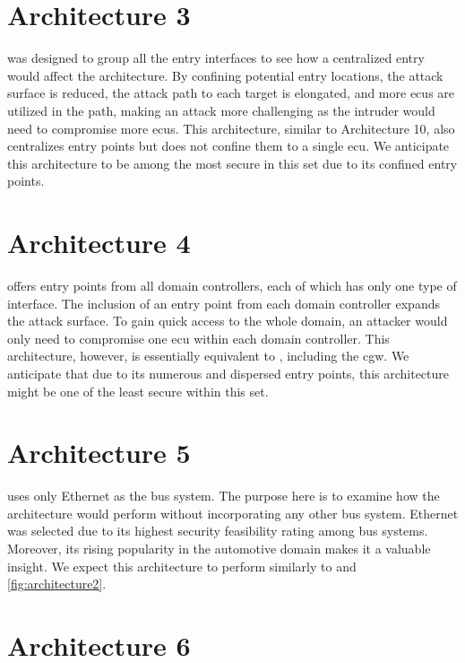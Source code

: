 \section{Architecture 3}
\label{subsec:arch3}

 was designed to group all the entry interfaces to see how a centralized entry would affect the architecture. 
By confining potential entry locations, the attack surface is reduced, the attack path to each target is elongated, 
and more \acrshort{ecu}s are utilized in the path, making an attack more challenging as the intruder would need to compromise more \acrshort{ecu}s. 
This architecture, similar to Architecture 10, also centralizes entry points but does not confine them to a single \acrshort{ecu}.
We anticipate this architecture to be among the most secure in this set due to its confined entry points.
\section{Architecture 4}
\label{subsec:arch4}

 offers entry points from all domain controllers, each of which has only one type of interface. 
The inclusion of an entry point from each domain controller expands the attack surface. 
To gain quick access to the whole domain, an attacker would only need to compromise one \acrshort{ecu} within each domain controller. 
This architecture, however, is essentially equivalent to , including the \acrshort{cgw}. 
We anticipate that due to its numerous and dispersed entry points, this architecture might be one of the least secure within this set.
\section{Architecture 5}
\label{subsec:arch5}

 uses only Ethernet as the bus system. 
The purpose here is to examine how the architecture would perform without incorporating any other bus system. 
Ethernet was selected due to its highest security feasibility rating among bus systems. 
Moreover, its rising popularity in the automotive domain makes it a valuable insight.
We expect this architecture to perform similarly to  and \ref{fig:architecture2}.

\section{Architecture 6}
\label{subsec:arch6}

